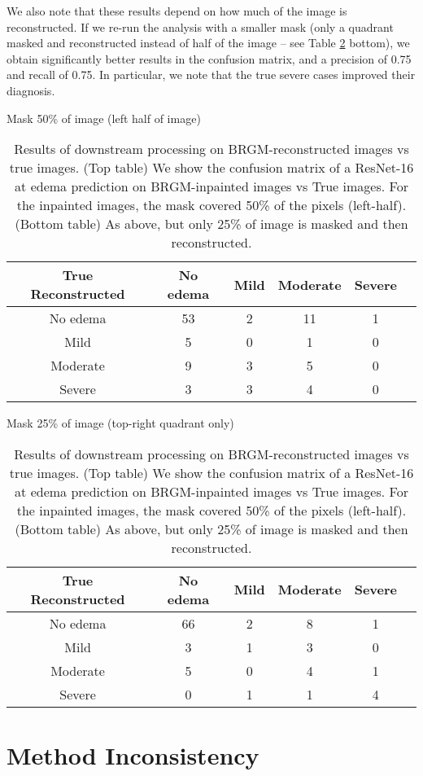 \documentclass{article}
\begin{document}
We also note that these results depend on how much of the image is reconstructed. If we re-run the analysis with a smaller mask (only a quadrant masked and reconstructed instead of half of the image -- see Table \ref{tab:downstream} bottom), we obtain significantly better results in the confusion matrix, and a precision of 0.75 and recall of 0.75. In particular, we note that the true severe cases improved their diagnosis.

\begin{table}
\centering
\renewcommand{\arraystretch}{1.5}Mask 50\% of image (left half of image)\\
\begin{tabular}{c|ccccc}
True Reconstructed & No edema	& Mild & Moderate & Severe\\
\hline
No edema & 53 & 2 & 11 & 1 \\ 
Mild & 5 & 0 & 1 & 0 \\
Moderate & 9 & 3 & 5 & 0 \\
Severe & 3 & 3 & 4 & 0 \\
\end{tabular}
\vspace{2.5em}

Mask 25\% of image (top-right quadrant only)\\
\begin{tabular}{c|ccccc}
True Reconstructed & No edema	& Mild & Moderate & Severe\\
\hline
No edema & 66 & 2 & 8 & 1\\
Mild & 3 & 1 & 3 & 0\\
Moderate & 5 & 0 & 4 & 1\\
Severe & 0 & 1 & 1 & 4\\
\end{tabular}
\caption{Results of downstream processing on BRGM-reconstructed images vs true images. (Top table) We show the confusion matrix of a ResNet-16 at edema prediction on BRGM-inpainted images vs True images. For the inpainted images, the mask covered 50\% of the pixels (left-half). (Bottom table) As above, but only 25\% of image is masked and then reconstructed. }
\label{tab:downstream}
\end{table}

\section{Method Inconsistency}
\label{inconsistency}
\end{document}
